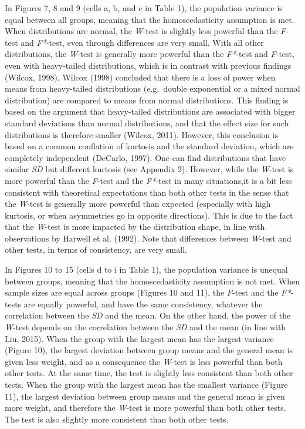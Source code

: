 \documentclass[man,floatsintext]{apa6}
\begin{document}
In Figures 7, 8 and 9 (cells a, b, and c in Table 1), the population variance is equal between all groups, meaning that the homoscedasticity assumption is met. When distributions are normal, the \emph{W}-test is slightly less powerful than the \emph{F}-test and \emph{F*}-test, even through differences are very small. With all other distributions, the \emph{W}-test is generally more powerful than the \emph{F*}-test and \emph{F}-test, even with heavy-tailed distributions, which is in contrast with previous findings (Wilcox, 1998). Wilcox (1998) concluded that there is a loss of power when means from heavy-tailed distributions (e.g.~double exponential or a mixed normal distribution) are compared to means from normal distributions. This finding is based on the argument that heavy-tailed distributions are associated with bigger standard deviations than normal distributions, and that the effect size for such distributions is therefore smaller (Wilcox, 2011). However, this conclusion is based on a common conflation of kurtosis and the standard deviation, which are completely independent (DeCarlo, 1997). One can find distributions that have similar \emph{SD} but different kurtosis (see Appendix 2). However, while the \emph{W}-test is more powerful than the \emph{F}-test and the \emph{F*}-test in many situations,it is a bit less consistent with theoretical expectations than both other tests in the sense that the \emph{W}-test is generally more powerful than expected (especially with high kurtosis, or when asymmetries go in opposite directions). This is due to the fact that the \emph{W}-test is more impacted by the distribution shape, in line with observations by Harwell et al. (1992). Note that differences between \emph{W}-test and other tests, in terms of consistency, are very small.

In Figures 10 to 15 (cells d to i in Table 1), the population variance is unequal between groups, meaning that the homoscedasticity assumption is not met. When sample sizes are equal across groups (Figures 10 and 11), the \emph{F}-test and the \emph{F*}-tests are equally powerful, and have the same consistency, whatever the correlation between the \emph{SD} and the mean. On the other hand, the power of the \emph{W}-test depends on the correlation between the \emph{SD} and the mean (in line with Liu, 2015). When the group with the largest mean has the largest variance (Figure 10), the largest deviation between group means and the general mean is given less weight, and as a consequence the \emph{W}-test is less powerful than both other tests. At the same time, the test is slightly less consistent than both other tests. When the group with the largest mean has the smallest variance (Figure 11), the largest deviation between group means and the general mean is given more weight, and therefore the \emph{W}-test is more powerful than both other tests. The test is also slightly more consistent than both other tests.
\end{document}

